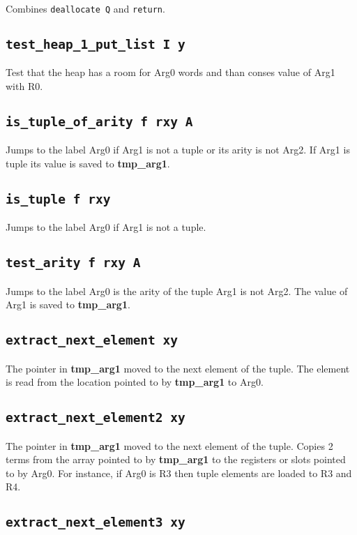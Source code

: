 \documentclass{article}
\newcommand{\tmpa}{\textbf{tmp\_arg1}}
\newcommand{\iop}[1]{\texttt{#1}}
\begin{document}
Combines \iop{deallocate Q} and \iop{return}.

\subsection*{\iop{test\_heap\_1\_put\_list I y}}

Test that the heap has a room for Arg0 words and than conses value of Arg1 with
R0.

\subsection*{\iop{is\_tuple\_of\_arity f rxy A}}

Jumps to the label Arg0 if Arg1 is not a tuple or its arity is not Arg2. If Arg1
is tuple its value is saved to \tmpa{}.

\subsection*{\iop{is\_tuple f rxy}}

Jumps to the label Arg0 if Arg1 is not a tuple.

\subsection*{\iop{test\_arity f rxy A}}

Jumps to the label Arg0 is the arity of the tuple Arg1 is not Arg2. The value of
Arg1 is saved to \tmpa{}.

\subsection*{\iop{extract\_next\_element xy}}

The pointer in \tmpa{} moved to the next element of the tuple. The element is
read from the location pointed to by \tmpa{} to Arg0.

\subsection*{\iop{extract\_next\_element2 xy}}

The pointer in \tmpa{} moved to the next element of the tuple. Copies 2 terms
from the array pointed to by \tmpa{} to the registers or slots pointed to by
Arg0. For instance, if Arg0 is R3 then tuple elements are loaded to R3 and R4.

\subsection*{\iop{extract\_next\_element3 xy}}
\end{document}
